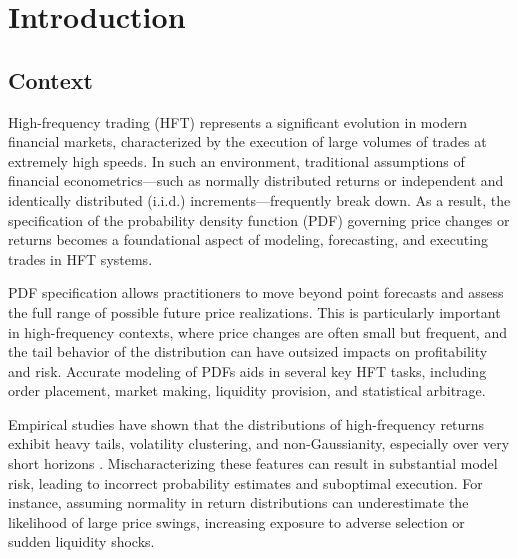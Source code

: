 \documentclass[
	12pt,				%
	oneside,			%
	a4paper,			%
	english,			%
	brazil				%
	]{abntex2ppgsi}
\begin{document}
\tableofcontents*
\cleardoublepage



\textual



% 
%
%
\chapter{Introduction}
\section{Context}
High-frequency trading (HFT) represents a significant evolution in modern financial markets, characterized by the execution of large volumes of trades at extremely high speeds. In such an environment, traditional assumptions of financial econometrics—such as normally distributed returns or independent and identically distributed (i.i.d.) increments—frequently break down. As a result, the specification of the probability density function (PDF) governing price changes or returns becomes a foundational aspect of modeling, forecasting, and executing trades in HFT systems.

PDF specification allows practitioners to move beyond point forecasts and assess the full range of possible future price realizations. This is particularly important in high-frequency contexts, where price changes are often small but frequent, and the tail behavior of the distribution can have outsized impacts on profitability and risk. Accurate modeling of PDFs aids in several key HFT tasks, including order placement, market making, liquidity provision, and statistical arbitrage.

Empirical studies have shown that the distributions of high-frequency returns exhibit heavy tails, volatility clustering, and non-Gaussianity, especially over very short horizons \cite{cont2001empirical}. Mischaracterizing these features can result in substantial model risk, leading to incorrect probability estimates and suboptimal execution. For instance, assuming normality in return distributions can underestimate the likelihood of large price swings, increasing exposure to adverse selection or sudden liquidity shocks.
\end{document}
